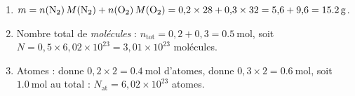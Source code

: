 \documentclass[11pt,a4paper]{article}
\begin{document}
\begin{corrige}
\begin{enumerate}[label=\alph*)]
  \item $m = n(\ce{N2})\,M(\ce{N2}) + n(\ce{O2})\,M(\ce{O2}) = 0{,}2\times 28 + 0{,}3\times 32
        = 5{,}6 + 9{,}6 = \SI{15.2}{\gram}$.
  \item Nombre total de \emph{molécules} : $n_{\text{tot}} = 0{,}2+0{,}3 = \SI{0.5}{\mole}$, soit
        $N = 0{,}5\times 6{,}02\times10^{23} = 3{,}01\times10^{23}$ molécules.
  \item Atomes :  donne $0{,}2\times 2 = \SI{0.4}{\mole}$ d'atomes,  donne
        $0{,}3\times 2 = \SI{0.6}{\mole}$, soit $\SI{1.0}{\mole}$ au total :
        $N_{\text{at}} = 6{,}02\times10^{23}$ atomes.
\end{enumerate}
\end{corrige}
\end{document}
